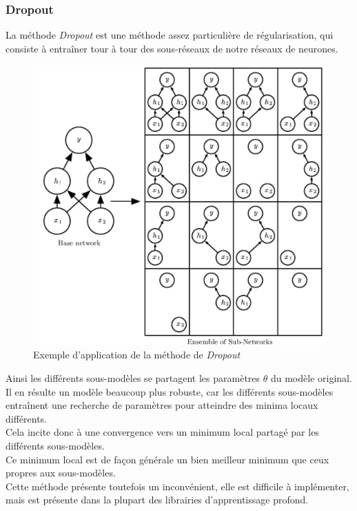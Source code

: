 \documentclass[10pt,a4paper]{report}
\begin{document}
			\subsubsection{Dropout}
			La méthode \emph{Dropout} est une méthode assez particulière de régularisation, qui consiste à entraîner tour à tour des sous-réseaux de notre réseaux de neurones.
			\begin{figure}[H]
				\begin{center}
					\includegraphics[scale=0.20]{Images/dropout.png}
					\caption{Exemple d'application de la méthode de \emph{Dropout}}
				\end{center}
			\end{figure}
			Ainsi les différents sous-modèles se partagent les paramètres $\theta$ du modèle original.\\
			Il en résulte un modèle beaucoup plus robuste, car les différents sous-modèles entraînent une recherche de paramètres pour atteindre des minima locaux différents.\\
			Cela incite donc à une convergence vers un minimum local partagé par les différents sous-modèles.\\
			Ce minimum local est de façon générale un bien meilleur minimum que ceux propres aux sous-modèles.\\
			Cette méthode présente toutefois un inconvénient, elle est difficile à implémenter, mais est présente dans la plupart des librairies d'apprentissage profond.
\end{document}
